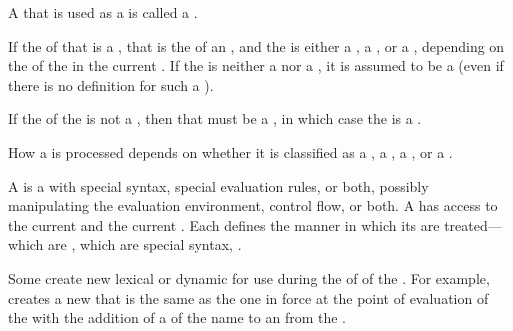A  that is used as a  is called a .

If the  of that  is a , 
that  is the  of an ,
and the  is either a , a ,
or a , depending on the   
of the  in the current .
If the  is neither a 
nor a , it is assumed to be a 
(even if there is no definition for such a ).

If the  of the  is not a ,
then that  must be a ,
in which case the  is a .

How a  is processed depends on whether it is 
classified as a , a , 
a , or a .


A  is a  with special syntax,
special evaluation rules, or both, possibly manipulating the
evaluation environment, control flow, or both.
A  has access to
    the current  
and the current .
Each  defines the manner in which its 
are treated---which are , which are special syntax, \etc.

Some  create new 
lexical or dynamic  for use during the 
 of 
of the .  For example,  creates a
new  that is the same as the one in force
at the point of evaluation of the  
with the addition of a  of the  name
to an  from the .

%

